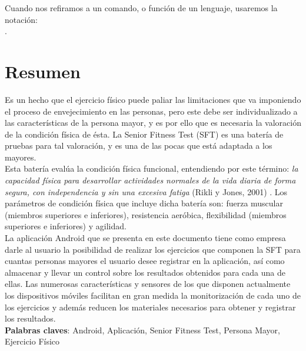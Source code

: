 Cuando nos refiramos a un comando, o función de un lenguaje, usaremos
la notación: \\ .\\

\cleardoublepage

\section*{Resumen}

Es un hecho que el ejercicio físico puede paliar las limitaciones que va imponiendo el proceso de envejecimiento en las personas, pero este debe ser individualizado a las características de la persona mayor, y es por ello que es necesaria la valoración de la condición física de ésta. La Senior Fitness Test (SFT) es una batería de pruebas para tal valoración, y es una de las pocas que está adaptada a los mayores.\\

Esta batería evalúa la condición física funcional, entendiendo por este término: \textit{la capacidad física para desarrollar actividades normales de la vida diaria de forma segura, con independencia y sin una excesiva fatiga} (Rikli y Jones, 2001) \cite{mitt04}. Los parámetros de condición física que incluye dicha batería son: fuerza muscular (miembros superiores e inferiores), resistencia aeróbica, flexibilidad (miembros superiores e inferiores) y agilidad.\\

La aplicación Android que se presenta en este documento tiene como empresa darle al usuario la posibilidad de realizar los ejercicios que componen la SFT para cuantas personas mayores el usuario desee registrar en la aplicación, así como almacenar y llevar un control sobre los resultados obtenidos para cada una de ellas. Las numerosas características y sensores de los que disponen actualmente los dispositivos móviles facilitan en gran medida la monitorización de cada uno de los ejercicios y además reducen los materiales necesarios para obtener y registrar los resultados.\\

\textbf{Palabras claves}: Android, Aplicación, Senior Fitness Test, Persona Mayor, Ejercicio Físico